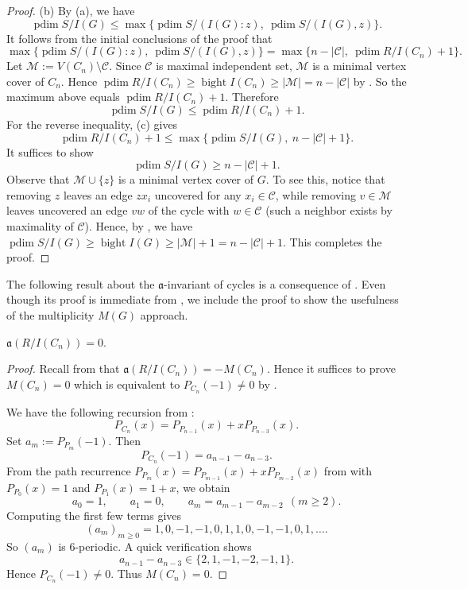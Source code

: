 \documentclass[12pt]{amsart}
\theoremstyle{plain}
\theoremstyle{definition}
\DeclareMathOperator{\pdim}{pdim}
\DeclareMathOperator{\bight}{bight}
\begin{document}
\begin{proof}
\medskip
\noindent\textup{(b)}
By (a), we have
\[
\pdim S/I(G)\le \max\{\pdim S/(I(G):z),\ \pdim S/(I(G),z)\}.
\]
It follows from the initial conclusions of the proof that 
$$
\max\{\pdim S/(I(G):z),\ \pdim S/(I(G),z)\}
=\max\{n-|\mathcal{C}|,\ \pdim R/I(C_n)+1\}.
$$ 
Let $\mathcal{M}:=V(C_n)\setminus \mathcal{C}$. Since $\mathcal{C}$ is maximal independent set, $\mathcal{M}$
is a minimal vertex cover of $C_n$. Hence $\pdim R/I(C_n)\ge \bight I(C_n)\ge |\mathcal{M}|=n-|\mathcal{C}|$ by
. So the maximum above equals
$\pdim R/I(C_n)+1$. Therefore
\[
\pdim S/I(G)\le \pdim R/I(C_n)+1.
\]
For the reverse inequality, (c) gives
\[
\pdim R/I(C_n)+1\le \max\{\pdim S/I(G),\ n-|\mathcal{C}|+1\}.
\]
It  suffices to show 
$$
\pdim S/I(G)\ge n-|\mathcal{C}|+1.
$$
Observe that $\mathcal{M}\cup\{z\}$ is a minimal
vertex cover of $G$. To see this, notice that removing $z$ leaves an edge $zx_i$ uncovered for any $x_i\in\mathcal{C}$, while
removing $v\in\mathcal{M}$ leaves uncovered an edge $vw$ of the cycle with $w\in\mathcal{C}$ (such a
neighbor exists by maximality of $\mathcal{C}$). Hence, by , we have 
$\pdim S/I(G)\ge  \bight I(G)\ge |\mathcal{M}|+1=n-|\mathcal{C}|+1$. This completes the proof.
\end{proof}



The following result about the $\mathfrak a$-invariant of cycles is a consequence of \cite[Theorem 4.5]{biermann2024degree}. Even though its proof is immediate from \cite{biermann2024degree}, we include the proof to show the usefulness of the multiplicity $M(G)$ approach. 

\begin{cor}\label{cor:only_cycle_a-inv}
$\mathfrak{a} (R/I(C_n))=0$.
\end{cor}


\begin{proof}
Recall from  that \(\mathfrak{a}(R/I(C_n))=-M(C_n)\).
Hence it suffices to prove $M(C_n)=0$ which is equivalent to  \(P_{C_n}(-1)\neq 0\) by .

We have the following recursion from :
\[
P_{C_n}(x)=P_{P_{n-1}}(x)+xP_{P_{n-3}}(x).
\]
Set \(a_m:=P_{P_m}(-1)\). Then
\[
P_{C_n}(-1)=a_{n-1}-a_{n-3}.
\]
From the path recurrence \(P_{P_m}(x)=P_{P_{m-1}}(x)+xP_{P_{m-2}}(x)\) from  with
\(P_{P_0}(x)=1\) and \(P_{P_1}(x)=1+x\), we obtain
\[
a_0=1,\qquad a_1=0,\qquad a_m=a_{m-1}-a_{m-2}\ \ (m\ge 2).
\]
Computing the first few terms gives
\[
(a_m)_{m\ge 0} = 1, 0, -1, -1, 0, 1, 1, 0, -1, -1, 0, 1,\ldots.
\]
So \((a_m)\) is \(6\)-periodic. A quick verification shows
\[
a_{n-1}-a_{n-3}\in\{2,1,-1,-2,-1,1\}.
\]
Hence \(P_{C_n}(-1)\neq 0\). Thus $M(C_n)=0$.
\end{proof}
\end{document}
